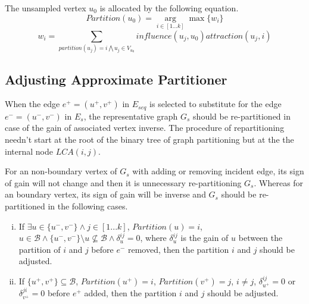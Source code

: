 \documentclass{sig-alternate-2013}
\begin{document}
The unsampled vertex $u_0$ is allocated by the following equation.
\begin{equation}\label{eq-label-vex}
Partition(u_0) = \underset{i\in[1...k]}\arg \max {\{w_i\}}
\end{equation}
\begin{equation}\label{eq-assign-weight}
w_i = \sum_{partition(u_j)=i\bigwedge u_j\in {V_{u_0}}} {influence(u_j, u_0) attraction(u_j, i)}
\end{equation}

\subsection {Adjusting Approximate Partitioner} \label{ch-sgls-adjust-ap}

When the edge $e^+=(u^+,v^+)$ in $E_{seq}$  is selected to substitute for the edge $e^-=(u^-,v^-)$ in $E_s$, the representative graph $G_s$ should be re-partitioned in case of the gain of associated vertex inverse.
The procedure of repartitioning needn't start at the root of the binary tree of graph partitioning but at the the internal node $LCA(i, j)$.

For an non-boundary vertex of $G_s$ with adding or removing incident edge, its sign of gain will not change and then it is unnecessary re-partitioning $G_s$.
Whereas for an boundary vertex, its sign of gain will be inverse and $G_s$ should be re-partitioned in the following cases.
\begin{enumerate}[i.]
\item\label{repartition-cond1}  If $\exists u \in \{u^-, v^-\} \wedge j \in {[1...k]}$, $Partition(u) = i$, $u \in \mathcal{B} \wedge \{u^-, v^-\}\setminus{u} \not\subseteq \mathcal{B} \wedge \delta_{u}^{ij}=0$, where $\delta_{u}^{ij}$ is the gain of $u$ between the partition of $i$ and $j$ before $e^-$ removed, then the partition $i$ and $j$ should be adjusted.
\item\label{repartition-cond2} If $\{u^+, v^+\} \subseteq \mathcal{B}$, $Partition(u^+)=i$, $Partition(v^+)=j$, $i \neq j$, $\delta_{u^+}^{ij}=0$ or $\delta_{v^+}^{ji}=0$ before $e^+$ added, then the partition $i$ and $j$ should be adjusted.
\end{enumerate}
\end{document}
